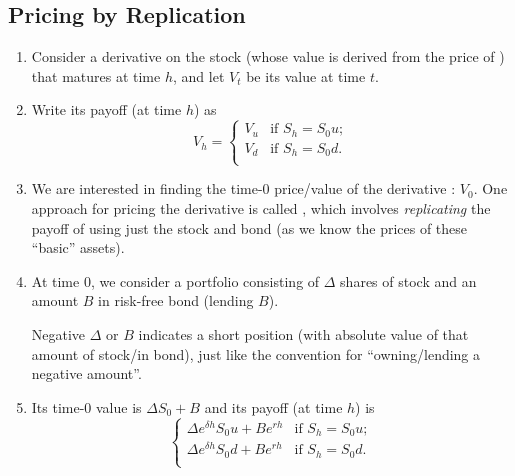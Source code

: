\subsection{Pricing by Replication}
\begin{enumerate}
\item Consider a derivative  on the stock 
(whose value is derived from the price of ) that matures at
time \(h\), and let \(V_t\) be its value at time \(t\).

\item Write its payoff (at time \(h\)) as
\[
V_h
=
\begin{cases}
V_u&\text{if }S_h=S_0u;\\
V_d&\text{if }S_h=S_0d.\\
\end{cases}
\]
\begin{center}
\end{center}

\item We are interested in finding the time-0 price/value of the derivative
: \(V_0\). One approach for pricing the derivative is called
, which involves \emph{replicating} the payoff of
 using just the stock  and bond
 (as we know the prices of these ``basic'' assets).

\item At time 0, we consider a portfolio consisting of \(\Delta\) shares of
stock  and an amount \(B\) in risk-free bond
 (lending \(B\)).

\begin{note}
Negative \(\Delta\) or \(B\) indicates a short position (with absolute value of
that amount of stock/in bond), just like the convention for ``owning/lending a
negative amount''.
\end{note}

\item Its time-0 value is \(\Delta S_0+B\) and its payoff (at time \(h\)) is
\[
\begin{cases}
\Delta e^{\delta h}S_0u+Be^{rh}&\text{if }S_h=S_0u;\\
\Delta e^{\delta h}S_0d+Be^{rh}&\text{if }S_h=S_0d.\\
\end{cases}
\]


\end{enumerate}
